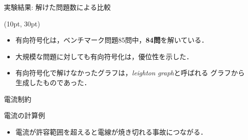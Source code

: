 \begin{frame}{実験結果: 解けた問題数による比較}
 
\begin{textblock*}{\linewidth}(10pt, 30pt)
\begin{table}[t]
 
\end{table}\vfill

\begin{itemize}
 \item 有向符号化は，ベンチマーク問題85問中，\textbf{84問}を解いている．
 \item 大規模な問題に対しても有向符号化は，優位性を示した．
 \item 有向符号化で解けなかったグラフは，\textit{leighton graph}と呼ばれる
       グラフから生成したものであった．
\end{itemize}\vfill
\end{textblock*}
\end{frame}
\begin{frame}{電流制約}
\vfill
 \begin{exampleblock}{電流の計算例}
  \centering
  
 \end{exampleblock}\vfill
 \begin{itemize}
  \item 電流が許容範囲を超えると電線が焼き切れる事故につながる．
 \end{itemize}\vfill
\end{frame}
